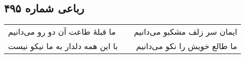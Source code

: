 \begin{center}
\section*{رباعی شماره ۴۹۵}
\label{sec:sh495}
\begin{longtable}{l p{0.5cm} r}
ما قبلهٔ طاعت آن دو رو می‌دانیم
&&
ایمان سر زلف مشکبو می‌دانیم
\\
با این همه دلدار به ما نیکو نیست
&&
ما طالع خویش را نکو می‌دانیم
\\
\end{longtable}
\end{center}
